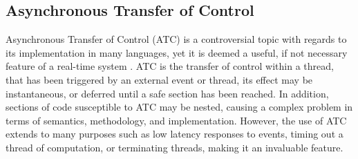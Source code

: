 \subsection{Asynchronous Transfer of Control}
Asynchronous Transfer of Control (ATC) is a controversial topic with regards to its 
implementation in many languages, yet it is deemed a useful, if not necessary 
feature of a real-time system 
\cite{atc-article}. ATC is the transfer 
of control within a thread, that has been triggered by an external event or thread, 
its effect may be instantaneous, or deferred until a safe section has been reached. 
In addition, sections of code susceptible to ATC may be nested, causing a 
complex problem in terms of semantics, methodology, and implementation. 
However, the use of ATC extends to many purposes such as low latency responses to events, timing 
out a thread of computation, or terminating threads, making it an invaluable feature. 
